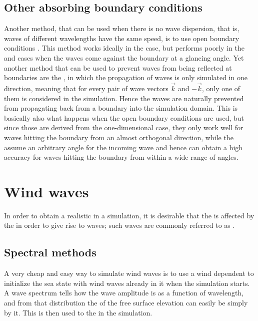 \subsection{Other absorbing boundary conditions}

Another method, that can be used when there is no wave dispersion, that is, waves of different wavelengths have the same speed, is to use open boundary conditions \citep{Muller-Fischer2008}. This method works ideally in the  case, but performs poorly in the  and  cases when the waves come against the boundary at a glancing angle. Yet another method that can be used to prevent waves from being reflected at boundaries are the \AWWE \citep{Guddati2005}, in which the propagation of waves is only simulated in one direction, meaning that for every pair of wave vectors $\vec{k}$ and $-\vec{k}$, only one of them is considered in the simulation. Hence the waves are naturally prevented from propagating back from a boundary into the simulation domain. This is basically also what happens when the open boundary conditions are used, but since those are derived from the one-dimensional case, they only work well for waves hitting the boundary from an almost orthogonal direction, while the \AWWE assume an arbitrary angle for the incoming wave and hence can obtain a high accuracy for waves hitting the boundary from within a wide range of angles.

\section{Wind waves}

In order to obtain a realistic  in a simulation, it is desirable that the  is affected by the \wind in order to give rise to waves; such waves are commonly referred to as .

\subsection{Spectral methods}

A very cheap and easy way to simulate wind waves is to use a wind dependent  to initialize the sea state with wind waves already in it when the simulation starts. A wave spectrum tells how the wave amplitude is \distributed as a function of wavelength, and from that distribution the  of the free surface elevation can easily be \generated simply by \sampling it. This is then used to \initialize the  in the simulation.

